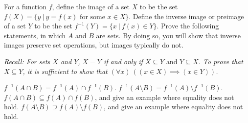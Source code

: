 \documentclass[11pt]{article}
\begin{document}

For a function $f$, define the image of a set $X$ to be the set $f(X) = \{y~|~y = f(x) \text{ for some } x \in X\}$. Define the inverse image or preimage of a set $Y$ to be the set $f^{-1}(Y) = \{x~|~f(x) \in Y\}$. Prove the following statements, in which $A$ and $B$ are sets. By doing so, you will show that inverse images preserve set operations, but images typically do not.

\textit{Recall: For sets $X$ and $Y$, $X=Y$ if and only if $X \subseteq Y \text{ and } Y \subseteq X$. To prove that $X \subseteq Y$, it is sufficient to show that $(\forall x)~((x \in X) \implies (x \in Y))$.}

\begin{Parts}
    \Part $f^{-1}(A \cap B) = f^{-1}(A) \cap f^{-1}(B)$.
    \Part $f^{-1}(A \setminus B) = f^{-1}(A) \setminus f^{-1}(B)$.
    \Part $f(A \cap B) \subseteq f(A) \cap f(B)$, and give an example where equality does not hold.
    \Part $f(A \setminus B) \supseteq f(A) \setminus f(B)$, and give an example where equality does not hold.
\end{Parts}
\end{document}
